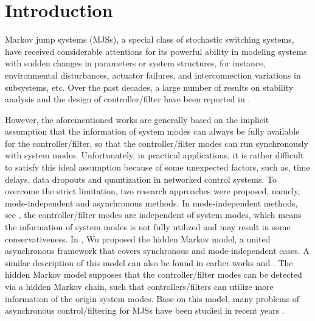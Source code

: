 \documentclass[journal,final,twocolumn]{IEEEtran}
\begin{document}
%
\IEEEpeerreviewmaketitle
  
   

\section{Introduction}
	Markov jump systems (MJSs), a special class of stochastic switching systems, have received considerable attentions for its powerful ability in modeling systems with sudden changes in parameters or system structures, for instance,  environmental disturbances, actuator failures, and interconnection variations in subsystems, etc. Over the past decades, a large number of results on stability analysis and the design of controller/filter have been reported in \cite{costa2006discrete, wu2014asynchronous, zhang2008analysis, shi2006designing, zhang2009stability}.
	
	However, the aforementioned works  are generally based on the implicit assumption that the information of system modes can always be  fully available for the controller/filter, so that the controller/filter modes can run synchronously with system modes. Unfortunately, in practical applications, it is rather difficult to satisfy this ideal assumption because of some unexpected factors, such as, time delays, data dropouts and quantization in networked control systems. To overcome the strict limitation, two research approaches were proposed, namely, mode-independent and asynchronous methods. In mode-independent methods, see \cite{todorov2016new,wu2005mode,dolgov2017static}, the controller/filter modes are independent of system modes, which means the information of system modes is not fully utilized and may result in some conservativeness. In \cite{wu2016passivity}, Wu proposed the hidden Markov model, a united asynchronous framework that covers synchronous and mode-independent cases. A similar description of this model can also be found in earlier works \cite{costa2006discrete} and \cite{do2014detector}. The hidden Markov model supposes that the controller/filter modes can be detected via a hidden Markov chain, such that controllers/filters can utilize more information of the origin system modes.  Base on this model, many problems of asynchronous control/filtering for MJSs have been studied in recent years \cite{de2017h,todorov2018detector,rodrigues2018detector}. 
	
\end{document}
